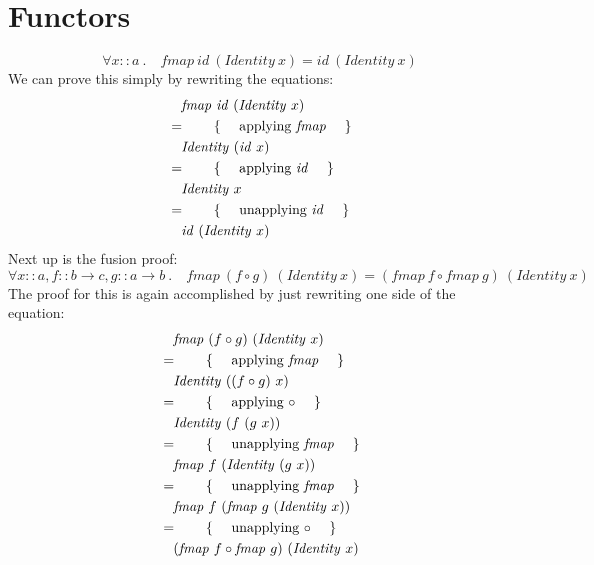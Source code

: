 \pagebreak \section{Functors}

\begin{displaymath}
\forall x :: \mathit{a}~. \quad \mathit{fmap}~\mathit{id}~(\mathit{Identity}~x) = \mathit{id}~(\mathit{Identity}~x)
\end{displaymath}
We can prove this simply by rewriting the equations:
\begin{align*}
&\quad \mathit{fmap}~\mathit{id}~(\mathit{Identity}~x)\\
&=\qquad\text{\{\quad\ applying $\mathit{fmap}$ \quad\}}\\
&\quad \mathit{Identity}~(\mathit{id}~x)\\
&=\qquad\text{\{\quad\ applying $\mathit{id}$ \quad\}}\\
&\quad \mathit{Identity}~x\\
&=\qquad\text{\{\quad\ unapplying $\mathit{id}$ \quad\}}\\
&\quad \mathit{id}~(\mathit{Identity}~x)
\end{align*}
Next up is the fusion proof:
\begin{displaymath}
\forall x :: \mathit{a}, f :: b \to c, g :: a \to b~. \quad \mathit{fmap}~(f \circ g)~(\mathit{Identity}~x) = (\mathit{fmap}~f \circ \mathit{fmap}~g)~(\mathit{Identity}~x)
\end{displaymath}
The proof for this is again accomplished by just rewriting one side of the equation:
\begin{align*}
&\quad \mathit{fmap}~(f \circ g)~(\mathit{Identity}~x)\\
&=\qquad\text{\{\quad\ applying $\mathit{fmap}$ \quad\}}\\
&\quad \mathit{Identity}~((f \circ g)~x)\\
&=\qquad\text{\{\quad\ applying $\circ$ \quad\}}\\
&\quad \mathit{Identity}~(f~(g~x))\\
&=\qquad\text{\{\quad\ unapplying $\mathit{fmap}$ \quad\}}\\
&\quad \mathit{fmap}~f~(\mathit{Identity}~(g~x))\\
&=\qquad\text{\{\quad\ unapplying $\mathit{fmap}$ \quad\}}\\
&\quad \mathit{fmap}~f~(\mathit{fmap}~g~(\mathit{Identity}~x))\\
&=\qquad\text{\{\quad\ unapplying $\circ$ \quad\}}\\
&\quad (\mathit{fmap}~f \circ \mathit{fmap}~g)~(\mathit{Identity}~x)
\end{align*}

